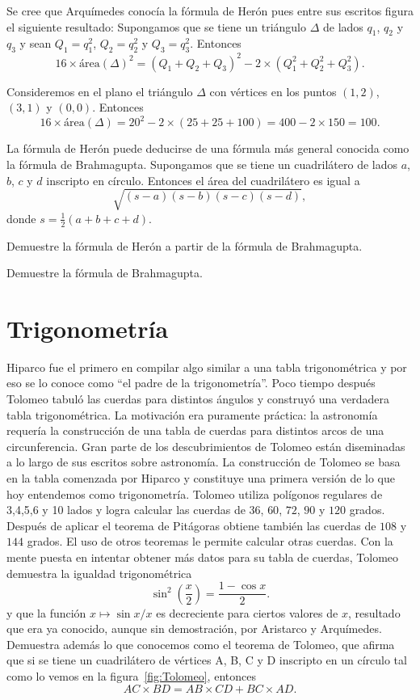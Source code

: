 Se cree que Arquímedes conocía la fórmula de Herón pues entre sus escritos
figura el siguiente resultado: Supongamos que se tiene un triángulo $\Delta$ de
lados $q_1$, $q_2$ y $q_3$ y sean $Q_1=q_1^2$, $Q_2=q_2^2$ y $Q_3=q_3^2$.
Entonces 
\[
	16\times \textrm{área}(\Delta)^2=(Q_1+Q_2+Q_3)^2-2\times(Q_1^2+Q_2^2+Q_3^2).
\]

\begin{example}
	Consideremos en el plano el triángulo $\Delta$ con vértices en los puntos
	$(1,2)$, $(3,1)$ y $(0,0)$. Entonces
	\[
		16\times\textrm{área}(\Delta)=20^2-2\times(25+25+100)=400-2\times 150=100.
	\]
\end{example}

La fórmula de Herón puede deducirse de una fórmula más general conocida como la
fórmula de Brahmagupta. Supongamos que se tiene un cuadrilátero de lados $a$,
$b$, $c$ y $d$ inscripto en círculo. Entonces el área del cuadrilátero es igual
a 
\[
	\sqrt{(s-a)(s-b)(s-c)(s-d)},
\]
donde $s=\frac12(a+b+c+d)$. 

\begin{exercise}
	Demuestre la fórmula de Herón a partir de la fórmula de Brahmagupta.
\end{exercise}

\begin{exercise}
	Demuestre la fórmula de Brahmagupta.
\end{exercise}

\section*{Trigonometría}

Hiparco fue el primero en compilar algo similar a una tabla trigonométrica y
por eso se lo conoce como ``el padre de la trigonometría''.  Poco tiempo
después Tolomeo tabuló las cuerdas para distintos ángulos y construyó una
verdadera tabla trigonométrica. La motivación era puramente práctica: la
astronomía requería la construcción de una tabla de cuerdas para distintos
arcos de una circunferencia. Gran parte de los descubrimientos de Tolomeo están
diseminadas a lo largo de sus escritos sobre astronomía.  La construcción de
Tolomeo se basa en la tabla comenzada por Hiparco y constituye una primera
versión de lo que hoy entendemos como trigonometría. Tolomeo utiliza polígonos
regulares de 3,4,5,6 y 10 lados y logra calcular las cuerdas de $36$, $60$,
$72$, $90$ y $120$ grados. Después de aplicar el teorema de Pitágoras obtiene
también las cuerdas de $108$ y $144$ grados. El uso de otros teoremas le
permite calcular otras cuerdas. Con la mente puesta en intentar obtener más
datos para su tabla de cuerdas, Tolomeo demuestra 
la igualdad trigonométrica 
\[
	\sin^2\left(\frac{x}{2}\right)=\frac{1-\cos x}{2}.
\]
y que la función $x\mapsto \sin x/x$ 
es decreciente para ciertos valores de $x$, resultado que era ya conocido,
aunque sin demostración, por Aristarco y Arquímedes.  Demuestra además lo que
conocemos como el teorema de Tolomeo, que afirma que si se tiene un
cuadrilátero de vértices A, B, C y D inscripto en un círculo tal como lo vemos
en la figura~\ref{fig:Tolomeo}, entonces
\[
	AC\times BD=AB\times CD+BC\times AD.
\]

